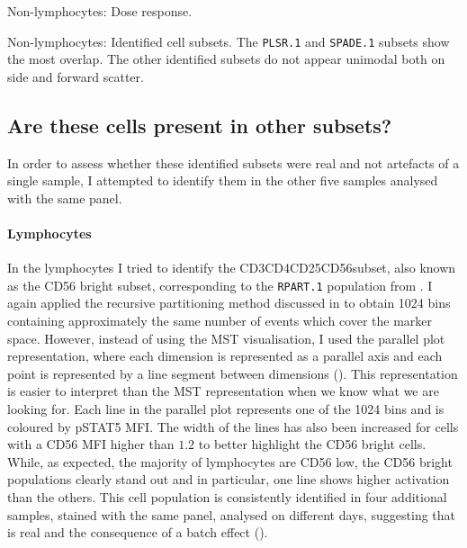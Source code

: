{ Non-lymphocytes: Dose response. }
{ }


{ Non-lymphocytes: Identified cell subsets. }
{
    The \texttt{PLSR.1} and \texttt{SPADE.1} subsets show the most overlap.
    The other identified subsets do not appear unimodal both on side and forward scatter.
}


\clearpage

\subsection{Are these cells present in other subsets?}

In order to assess whether these identified subsets were real and not artefacts of a single sample, I attempted to identify them in the other five samples analysed with the same panel.

\paragraph{Lymphocytes}

In the lymphocytes I tried to identify the CD3\negative CD4\negative CD25\negative CD56\positive  subset, also known as the CD56 bright subset, corresponding to the \texttt{RPART.1} population from .
I again applied the recursive partitioning method discussed in  to obtain 1024 bins containing approximately the same number of events which cover the marker space.
However, instead of using the \gls{MST} visualisation, I used the parallel plot representation, where each dimension is represented as a parallel axis and each point is represented by a line segment between dimensions ().
This representation is easier to interpret than the \gls{MST} representation when we know what we are looking for.
Each line in the parallel plot represents one of the 1024 bins and is coloured by pSTAT5 MFI.
The width of the lines has also been increased for cells with a CD56 MFI higher than $1.2$ to better highlight the CD56 bright cells.
While, as expected, the majority of lymphocytes are CD56 low, the CD56 bright populations clearly stand out and in particular, one line shows higher activation than the others.
This cell population is consistently identified in four additional samples, stained with the same panel, analysed on different days, suggesting that is real and the consequence of a batch effect ().

